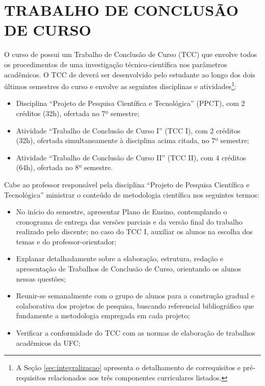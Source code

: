 \chapter{TRABALHO DE CONCLUSÃO DE CURSO}
\label{cap:trabalho-de-conclusao-de-curso}

O curso de \nomedocurso possui um Trabalho de Conclusão de Curso (TCC) que envolve todos os procedimentos de uma investigação técnico-científica nos parâmetros acadêmicos. O TCC de \nomedocurso deverá ser desenvolvido pelo estudante ao longo dos dois últimos semestres do curso e envolve as seguintes disciplinas e atividades\footnote{A Seção \ref{sec:integralizacao} apresenta o detalhamento de correquisitos e pré-requisitos relacionados aos três componentes curriculares listados.}:
\begin{itemize}
    \item Disciplina ``Projeto de Pesquisa Científica e Tecnológica'' (PPCT), com 2 créditos (32h), ofertada no 7º semestre;
    \item Atividade ``Trabalho de Conclusão de Curso I'' (TCC I), com 2 créditos (32h), ofertada simultaneamente à disciplina acima citada, no 7º semestre;
    \item Atividade ``Trabalho de Conclusão de Curso II'' (TCC II), com 4 créditos (64h), ofertada no 8º semestre.
\end{itemize}



Cabe ao professor responsável pela disciplina ``Projeto de Pesquisa Científica e Tecnológica'' ministrar o conteúdo de metodologia científica nos seguintes termos:
\begin{itemize}
    \item No início do semestre, apresentar Plano de Ensino, contemplando o cronograma de entrega das versões parciais e da versão final do trabalho realizado pelo discente; no caso do TCC I, auxiliar os alunos na escolha dos temas e do professor-orientador;

    \item Explanar detalhadamente sobre a elaboração, estrutura, redação e apresentação de Trabalhos de Conclusão de Curso, orientando os alunos nessas questões;
    
    \item Reunir-se semanalmente com o grupo de alunos para a construção gradual e colaborativa dos projetos de pesquisa, buscando referencial bibliográfico que fundamente a metodologia empregada em cada projeto;

    \item Verificar a conformidade do TCC com as normas de elaboração de trabalhos acadêmicos da UFC;
    


\end{itemize}

